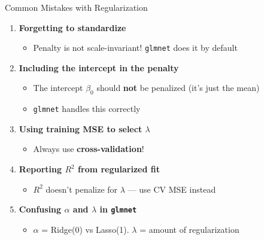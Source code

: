 \documentclass[aspectratio=169, 11pt]{beamer}
\begin{document}
\begin{frame}{Common Mistakes with Regularization}
\begin{enumerate}
  \item \textbf{Forgetting to standardize}
  \begin{itemize}
    \item[$\circ$] Penalty is not scale-invariant! \texttt{glmnet} does it by default
  \end{itemize}
  \vspace{0.2em}
  \item \textbf{Including the intercept in the penalty}
  \begin{itemize}
    \item[$\circ$] The intercept $\beta_0$ should \textbf{not} be penalized (it's just the mean)
    \item[$\circ$] \texttt{glmnet} handles this correctly
  \end{itemize}
  \vspace{0.2em}
  \item \textbf{Using training MSE to select $\lambda$}
  \begin{itemize}
    \item[$\circ$] Always use \textbf{cross-validation}!
  \end{itemize}
  \vspace{0.2em}
  \item \textbf{Reporting $R^2$ from regularized fit}
  \begin{itemize}
    \item[$\circ$] $R^2$ doesn't penalize for $\lambda$ --- use CV MSE instead
  \end{itemize}
  \vspace{0.2em}
  \item \textbf{Confusing $\alpha$ and $\lambda$ in \texttt{glmnet}}
  \begin{itemize}
    \item[$\circ$] $\alpha$ = Ridge(0) vs Lasso(1). $\lambda$ = amount of regularization
  \end{itemize}
\end{enumerate}
\end{frame}
\end{document}
